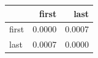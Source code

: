 \begin{tabular}{lrr}
\toprule
 & first & last \\
\midrule
first & 0.0000 & 0.0007 \\
last & 0.0007 & 0.0000 \\
\bottomrule
\end{tabular}
